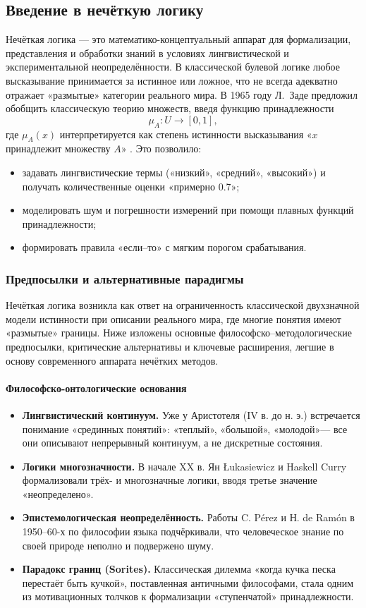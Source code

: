 \subsection{Введение в нечёткую логику}
Нечёткая логика --- это математико-концептуальный аппарат для формализации, представления и обработки знаний в условиях лингвистической и экспериментальной неопределённости. В классической булевой логике любое высказывание принимается за истинное или ложное, что не всегда адекватно отражает «размытые» категории реального мира. В 1965 году Л.~Заде предложил обобщить классическую теорию множеств, введя функцию принадлежности
\[
  \mu_A: U \to [0,1],
\]
где \(\mu_A(x)\) интерпретируется как степень истинности высказывания «\(x\) принадлежит множеству \(A\)» \cite{Zadeh1965}. Это позволило:
\begin{itemize}
  \item задавать лингвистические термы («низкий», «средний», «высокий») и получать количественные оценки «примерно 0.7»;
  \item моделировать шум и погрешности измерений при помощи плавных функций принадлежности;
  \item формировать правила «если–то» с мягким порогом срабатывания.
\end{itemize}

\subsubsection{Предпосылки и альтернативные парадигмы}
\label{subsec:theory_foundations_expand}

Нечёткая логика возникла как ответ на ограниченность классической двухзначной модели истинности при описании реального мира, где многие понятия имеют «размытые» границы. Ниже изложены основные философско–методологические предпосылки, критические альтернативы и ключевые расширения, легшие в основу современного аппарата нечётких методов.

\paragraph{Философско-онтологические основания}
\begin{itemize}
  \item \textbf{Лингвистический континуум.} Уже у Аристотеля (IV в. до н. э.) встречается понимание «срединных понятий»: «теплый», «большой», «молодой»— все они описывают непрерывный континуум, а не дискретные состояния.
  \item \textbf{Логики многозначности.} В начале XX в. Ян Łukasiewicz и Haskell Curry формализовали трёх- и многозначные логики, вводя третье значение «неопределено».
  \item \textbf{Эпистемологическая неопределённость.} Работы C. Pérez и Н. de Ramón в 1950–60-х по философии языка подчёркивали, что человеческое знание по своей природе неполно и подвержено шуму.
  \item \textbf{Парадокс границ (Sorites).} Классическая дилемма «когда кучка песка перестаёт быть кучкой», поставленная античными философами, стала одним из мотивационных толчков к формализации «ступенчатой» принадлежности.
\end{itemize}

